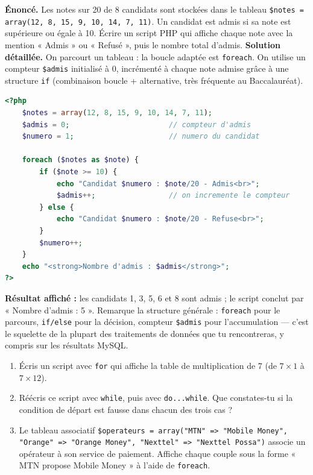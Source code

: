 \documentclass[11pt]{article}
\begin{document}
\begin{exoresolu}
\textbf{Énoncé.} Les notes sur 20 de 8 candidats sont stockées dans le tableau \texttt{\$notes = array(12, 8, 15, 9, 10, 14, 7, 11)}. Un candidat est admis si sa note est supérieure ou égale à 10. Écrire un script PHP qui affiche chaque note avec la mention « Admis » ou « Refusé », puis le nombre total d'admis.
\tcblower
\textbf{Solution détaillée.} On parcourt un tableau : la boucle adaptée est \texttt{foreach}. On utilise un compteur \texttt{\$admis} initialisé à 0, incrémenté à chaque note admise grâce à une structure \texttt{if} (combinaison boucle + alternative, très fréquente au Baccalauréat).
\begin{lstlisting}[language=Php]
<?php
    $notes = array(12, 8, 15, 9, 10, 14, 7, 11);
    $admis = 0;                       // compteur d'admis
    $numero = 1;                      // numero du candidat

    foreach ($notes as $note) {
        if ($note >= 10) {
            echo "Candidat $numero : $note/20 - Admis<br>";
            $admis++;                 // on incremente le compteur
        } else {
            echo "Candidat $numero : $note/20 - Refuse<br>";
        }
        $numero++;
    }
    echo "<strong>Nombre d'admis : $admis</strong>";
?>
\end{lstlisting}
\textbf{Résultat affiché :} les candidats 1, 3, 5, 6 et 8 sont admis ; le script conclut par « Nombre d'admis : 5 ». Remarque la structure générale : \texttt{foreach} pour le parcours, \texttt{if/else} pour la décision, compteur \texttt{\$admis} pour l'accumulation — c'est le squelette de la plupart des traitements de données que tu rencontreras, y compris sur les résultats MySQL.
\end{exoresolu}

\begin{exercice}
\begin{enumerate}
  \item Écris un script avec \texttt{for} qui affiche la table de multiplication de 7 (de $7 \times 1$ à $7 \times 12$).
  \item Réécris ce script avec \texttt{while}, puis avec \texttt{do...while}. Que constates-tu si la condition de départ est fausse dans chacun des trois cas ?
  \item Le tableau associatif \texttt{\$operateurs = array("MTN" => "Mobile Money", "Orange" => "Orange Money", "Nexttel" => "Nexttel Possa")} associe un opérateur à son service de paiement. Affiche chaque couple sous la forme « MTN propose Mobile Money » à l'aide de \texttt{foreach}.
\end{enumerate}
\end{exercice}
\end{document}
